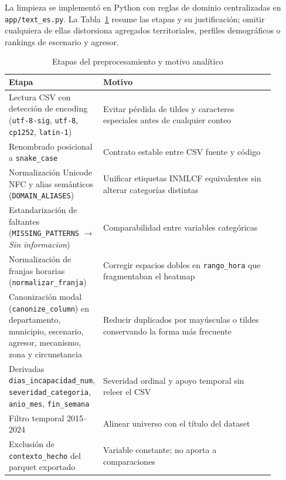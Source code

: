 \documentclass[
	a4paper,
	10pt,
	unnumberedsections,
	twoside,
]{LTJournalArticle}
\begin{document}
La limpieza se implement\'o en Python con reglas de dominio centralizadas en \texttt{app/text\_es.py}.
La Tabla~\ref{tab:prep} resume las etapas y su justificaci\'on; omitir cualquiera de ellas distorsiona agregados territoriales, perfiles demogr\'aficos o rankings de escenario y agresor.

\begin{table}[htbp]
	\centering
	\small
	\caption{Etapas del preprocesamiento y motivo anal\'itico}
	\label{tab:prep}
	\begin{tabular}{@{}p{0.22\linewidth}p{0.68\linewidth}@{}}
		\toprule
		\textbf{Etapa} & \textbf{Motivo} \\
		\midrule
		Lectura CSV con detecci\'on de encoding (\texttt{utf-8-sig}, \texttt{utf-8}, \texttt{cp1252}, \texttt{latin-1}) & Evitar p\'erdida de tildes y caracteres especiales antes de cualquier conteo \\
		Renombrado posicional a \texttt{snake\_case} & Contrato estable entre CSV fuente y c\'odigo \\
		Normalizaci\'on Unicode NFC y alias sem\'anticos (\texttt{DOMAIN\_ALIASES}) & Unificar etiquetas INMLCF equivalentes sin alterar categor\'ias distintas \\
		Estandarizaci\'on de faltantes (\texttt{MISSING\_PATTERNS} $\rightarrow$ \emph{Sin informacion}) & Comparabilidad entre variables categ\'oricas \\
		Normalizaci\'on de franjas horarias (\texttt{normalizar\_franja}) & Corregir espacios dobles en \texttt{rango\_hora} que fragmentaban el heatmap \\
		Canonizaci\'on modal (\texttt{canonize\_column}) en departamento, municipio, escenario, agresor, mecanismo, zona y circunstancia & Reducir duplicados por may\'usculas o tildes conservando la forma m\'as frecuente \\
		Derivadas \texttt{dias\_incapacidad\_num}, \texttt{severidad\_categoria}, \texttt{anio\_mes}, \texttt{fin\_semana} & Severidad ordinal y apoyo temporal sin releer el CSV \\
		Filtro temporal 2015--2024 & Alinear universo con el t\'itulo del dataset \\
		Exclusi\'on de \texttt{contexto\_hecho} del parquet exportado & Variable constante; no aporta a comparaciones \\
		\bottomrule
	\end{tabular}
\end{table}
\end{document}
